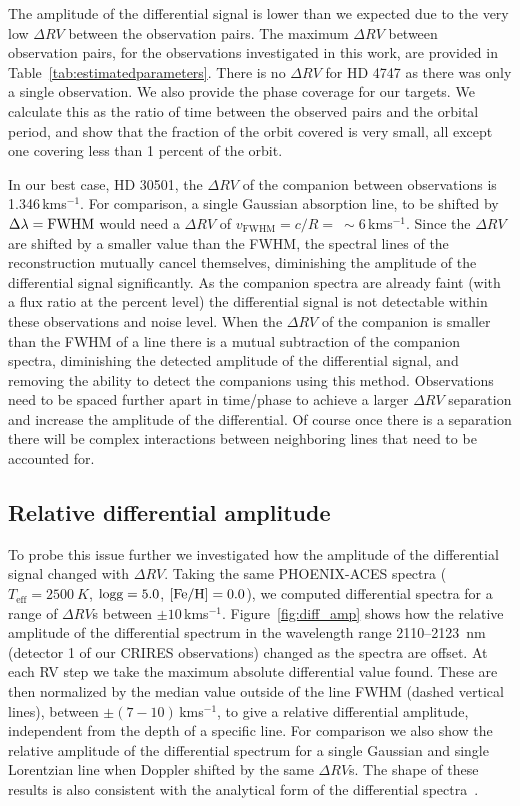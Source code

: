 \documentclass[fleqn,usenatbib]{mnras}
\newcommand{\kmps}{\,kms\(^{-1}\)}	%
\newcommand*\rd{\color{red}}
\begin{document}
    The amplitude of the differential signal is lower than we expected due to the very low \(\Delta RV\) between the observation pairs. The maximum \(\Delta RV\) between observation pairs, for the observations investigated in this work, are provided in Table~\ref{tab:estimatedparameters}. {\rd There is no \(\Delta RV\) for {HD 4747} as there was only a single observation. We also provide the phase coverage for our targets. We calculate this as the ratio of time between the observed pairs and the orbital period, and show that the fraction of the orbit covered is very small, all except one covering less than 1 percent of the orbit.}
    
    In our best case, {HD 30501}, the \(\Delta RV\) of the companion between observations is 1.346\kmps{}. For comparison, a single Gaussian absorption line, to be shifted by \(\Delta\lambda = \rm FWHM\) would need a \(\Delta RV\) of \(v_{\textrm{FWHM}} = c/R =~\sim6\)\kmps{}. Since the \(\Delta RV\) are shifted by a smaller value than the FWHM, the spectral lines of the reconstruction mutually cancel themselves, diminishing the amplitude of the differential signal significantly. As the companion spectra are already faint (with a flux ratio at the percent level) the differential signal is not detectable within these observations and noise level.
    When the \(\Delta RV \) of the companion is smaller than the FWHM of a line there is a mutual subtraction of the companion spectra, diminishing the detected amplitude of the differential signal, and removing the ability to detect the companions using this method. Observations need to be spaced further apart in time/phase to achieve a larger \(\Delta RV\) separation and increase the amplitude of the differential. Of course once there is a separation there will be complex interactions between neighboring lines that need to be accounted for.
    
    \subsection{Relative differential amplitude}
    To probe this issue further we investigated how the amplitude of the differential signal changed with \(\Delta RV \). Taking the same PHOENIX-ACES spectra (\(T_{\textrm{eff}} = 2500~K \), \(\rm logg=5.0 \), \(\rm [Fe/H]=0.0 \)), we computed differential spectra for a range of \(\Delta RV\)s between \(\pm10\)\kmps{}. Figure~\ref{fig:diff_amp} shows how the relative amplitude of the differential spectrum in the wavelength range 2110--2123~nm (detector 1 of our CRIRES observations) changed as the spectra are offset. At each RV step we take the maximum absolute differential value found. These are then normalized by the median value outside of the line FWHM (dashed vertical lines), between \(\pm(7-10)\)\kmps{}, to give a relative differential amplitude, independent from the depth of a specific line. For comparison we also show the relative amplitude of the differential spectrum for a single Gaussian and single Lorentzian line when Doppler shifted by the same \(\Delta RV \)s. The shape of these results is also consistent with the analytical form of the differential spectra~\citet[][eqn.~A.1]{ferluga_separating_1997}.
    
\end{document}
